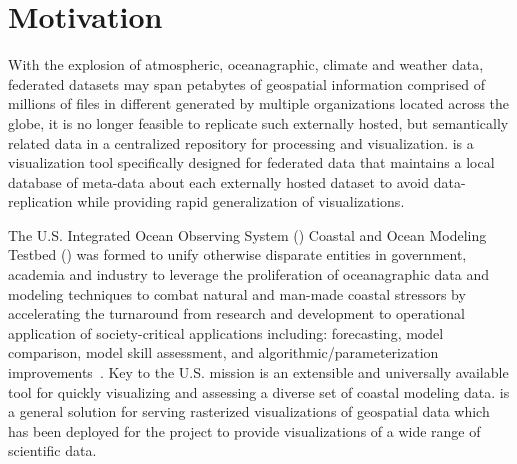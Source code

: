 \section{Motivation}
\label{sec:motivation}
With the explosion of atmospheric, oceanagraphic, climate and weather
data, federated datasets may span petabytes of geospatial information
comprised of millions of files in different generated by multiple
organizations located across the globe, it is no longer feasible to
replicate such externally hosted, but semantically related data in a
centralized repository for processing and visualization.  \sciwms{} is
a visualization tool specifically designed for federated data that
maintains a local database of meta-data about each externally hosted
dataset to avoid data-replication while providing rapid
generalization of visualizations.

The U.S. Integrated Ocean Observing System (\ioos{}) Coastal and Ocean
Modeling Testbed (\comt{}) was formed to unify otherwise disparate
entities in government, academia and industry to leverage the
proliferation of oceanagraphic data and modeling techniques to combat
natural and man-made coastal stressors by accelerating the turnaround
from research and development to operational application of
society-critical applications including: forecasting, model
comparison, model skill assessment, and algorithmic/parameterization
improvements~\cite{luettich13}. Key to the U.S. \ioos{} \comt{}
mission is an extensible and universally available tool for quickly
visualizing and assessing a diverse set of coastal modeling
data. \sciwms{} is a general \ogc{} \wms{} solution for serving
rasterized visualizations of geospatial data which has been deployed
for the \comt{} project to provide visualizations of a wide range of
scientific data.
